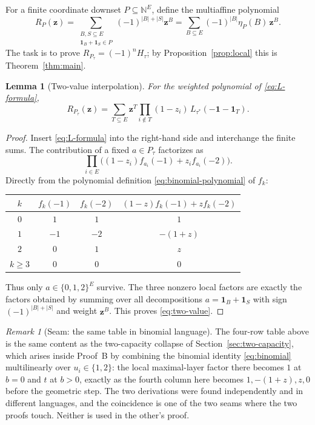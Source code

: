 \documentclass[11pt]{article}
\numberwithin{equation}{section}
\newtheorem{lemma}[theorem]{Lemma}
\theoremstyle{definition}
\theoremstyle{remark}
\newtheorem{remark}[theorem]{Remark}
\newcommand{\N}{\mathbb N}
\newcommand{\one}{\mathbf 1}
\newcommand{\zt}[1]{\mathbf z^{#1}}
\newcommand{\omitprod}[1]{\prod_{i\notin #1}(1-z_i)}
\begin{document}
For a finite coordinate downset $P\subseteq\N^E$, define the multiaffine
polynomial
\begin{equation}
 R_P(\mathbf z)=
 \sum_{\substack{B,S\subseteq E\\\one_B+\one_S\in P}}
 (-1)^{|B|+|S|}\zt B
 =\sum_{B\subseteq E}(-1)^{|B|}\eta_P(B)\,\zt B .
 \label{eq:R}
\end{equation}
The task is to prove $R_{P_\tau}=(-1)^nH_\tau$; by
Proposition~\ref{prop:local} this is Theorem~\ref{thm:main}.

\begin{lemma}[Two-value interpolation]
\label{lem:interpolation}
For the weighted polynomial of \eqref{eq:L-formula},
\begin{equation}
 R_{P_\tau}(\mathbf z)
 =\sum_{T\subseteq E}\zt T\omitprod T\,
       L_{\tau^*}(-\one-\one_T).
 \label{eq:two-value}
\end{equation}
\end{lemma}

\begin{proof}
Insert \eqref{eq:L-formula} into the right-hand side and interchange the
finite sums. The contribution of a fixed $a\in P_\tau$ factorizes as
\begin{equation}
 \prod_{i\in E}\bigl((1-z_i)f_{a_i}(-1)+z_i f_{a_i}(-2)\bigr).
 \label{eq:local-interpolation}
\end{equation}
Directly from the polynomial definition \eqref{eq:binomial-polynomial} of
$f_k$:
\begin{center}
\begin{tabular}{@{}c c c c@{}}
\toprule
$k$ & $f_k(-1)$ & $f_k(-2)$ & $(1-z)f_k(-1)+zf_k(-2)$\\
\midrule
$0$ & $1$ & $1$ & $1$\\
$1$ & $-1$ & $-2$ & $-(1+z)$\\
$2$ & $0$ & $1$ & $z$\\
$k\ge3$ & $0$ & $0$ & $0$\\
\bottomrule
\end{tabular}
\end{center}
Thus only $a\in\{0,1,2\}^E$ survive. The three nonzero local factors are
exactly the factors obtained by summing over all decompositions
$a=\one_B+\one_S$ with sign $(-1)^{|B|+|S|}$ and weight $\zt B$. This proves
\eqref{eq:two-value}.
\end{proof}

\begin{remark}[Seam: the same table in binomial language]
\label{rem:seam-table}
The four-row table above is the same content as the two-capacity collapse of
Section~\ref{sec:two-capacity}, which arises inside Proof~B by combining the
binomial identity \eqref{eq:binomial} multilinearly over $u_i\in\{1,2\}$: the
local maximal-layer factor there becomes $1$ at $b=0$ and $t$ at $b>0$,
exactly as the fourth column here becomes $1,-(1+z),z,0$ before the geometric
step. The two derivations were found independently and in different
languages, and the coincidence is one of the two seams where the two proofs
touch. Neither is used in the other's proof.
\end{remark}
\end{document}

